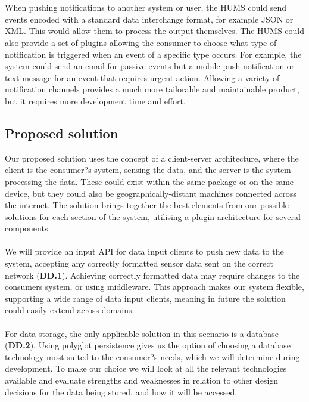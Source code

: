\documentclass[10pt,a4paper]{article}
\begin{document}
\\ \\
When pushing notifications to another system or user, the HUMS could send events
encoded with a standard data interchange format, for example JSON or XML. This
would allow them to process the output themselves. The HUMS could also provide a
set of plugins allowing the consumer to choose what type of notification is
triggered when an event of a specific type occurs. For example, the system could
send an email for passive events but a mobile push notification or text message
for an event that requires urgent action. Allowing a variety of notification
channels provides a much more tailorable and maintainable product, but it
requires more development time and effort.

\subsection{Proposed solution}
Our proposed solution uses the concept of a client-server architecture, where
the client is the consumer?s system, sensing the data, and the server is the
system processing the data. These could exist within the same package or on the
same device, but they could also be geographically-distant machines connected
across the internet. The solution brings together the best elements from our
possible solutions for each section of the system, utilising a plugin
architecture for several components.
\\ \\
We will provide an input API for data input clients to push new data to the
system, accepting any correctly formatted sensor data sent on the correct
network (\textbf{DD.1}). Achieving correctly formatted data may require changes
to the consumers system, or using middleware. This approach makes our system
flexible, supporting a wide range of data input clients, meaning in future the
solution could easily extend across domains.
\\ \\
For data storage, the only applicable solution in this scenario is a database
(\textbf{DD.2}). Using polyglot persistence gives us the option of choosing a
database technology most suited to the consumer?s needs, which we will determine
during development. To make our choice we will look at all the relevant
technologies available and evaluate strengths and weaknesses in relation to
other design decisions for the data being stored, and how it will be accessed.
\\ \\
\end{document}
